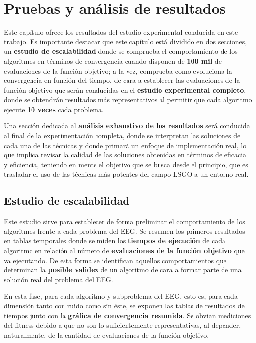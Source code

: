 \chapter{Pruebas y análisis de resultados}\label{cap:PruebasResultados}

Este capítulo ofrece los resultados del estudio experimental conducida en este trabajo. Es importante destacar que este capítulo está dividido en dos secciones, un \textbf{estudio de escalabilidad} donde se comprueba el comportamiento de los algoritmos en términos de convergencia cuando disponen de \textbf{100 mil} de evaluaciones de la función objetivo; a la vez, comprueba como evoluciona la convergencia en función del tiempo, de cara a establecer las evaluaciones de la función objetivo que serán conducidas en el \textbf{estudio experimental completo}, donde se obtendrán resultados más representativos al permitir que cada algoritmo ejecute \textbf{10 veces} cada problema.

Una sección dedicada al \textbf{análisis exhaustivo de los resultados} será conducida al final de la experimentación completa, donde se interpretan las soluciones de cada una de las técnicas y donde primará un enfoque de implementación real, lo que implica revisar la calidad de las soluciones obtenidas en términos de eficacia y eficiencia, teniendo en mente el objetivo que se busca desde el principio, que es trasladar el uso de las técnicas más potentes del campo LSGO a un entorno real.

\section{Estudio de escalabilidad}\label{sect:FE1}

Este estudio sirve para establecer de forma preliminar el comportamiento de los algoritmos frente a cada problema del EEG. Se resumen los primeros resultados en tablas temporales  donde se miden los \textbf{tiempos de ejecución} de cada algoritmo en relación al número de \textbf{evaluaciones de la función objetivo} que va ejecutando. De esta forma se identifican aquellos comportamientos que determinan la \textbf{posible validez} de un algoritmo de cara a formar parte de una solución real del problema del EEG. 

En esta fase, para cada algoritmo y subproblema del EEG, esto es, para cada dimensión tanto con ruido como sin éste, se exponen las tablas de resultados de tiempos junto con la \textbf{gráfica de convergencia resumida}. Se obvian mediciones del fitness debido a que no son lo suficientemente representativas, al depender, naturalmente, de la cantidad de evaluaciones de la función objetivo. 

